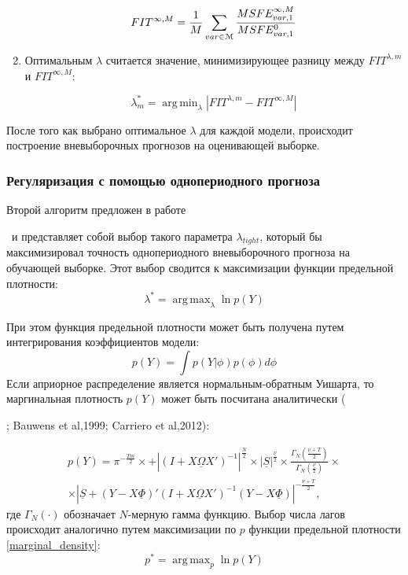 \documentclass[11pt]{article} %
\DeclareMathOperator*{\argmax}{arg\,max}
\DeclareMathOperator*{\argmin}{arg\,min}
\newcommand{\prior}{\underline}
\newcommand{\eng}[1]{\begin{otherlanguage}{english}#1\end{otherlanguage}}
\begin{document}
\begin{enumerate}
\begin{equation}
FIT^{\infty,M}=\frac{1}{M} \sum_{var\in \EuScript{M}} \frac{MSFE_{var,1}^{\infty,M}}{MSFE_{var,1}^{0}}
\end{equation}
\item Оптимальным $\lambda$ считается значение, минимизирующее разницу между $FIT^{\lambda,m}$ и $FIT^{\infty,M}$:

\begin{equation}
\lambda^*_m=\argmin_{\lambda} |FIT^{\lambda, m}-FIT^{\infty,M}|
\end{equation}
\end{enumerate}

После того как выбрано оптимальное $\lambda$ для каждой модели, происходит построение вневыборочных прогнозов на оценивающей выборке.

\subsubsection{Регуляризация с помощью однопериодного прогноза }

Второй алгоритм предложен в работе \eng{\cite{doan_al_1984}}~и представляет собой выбор такого параметра $\lambda_{tight}$, который бы максимизировал точность однопериодного вневыборочного прогноза на обучающей выборке. Этот выбор сводится к максимизации функции предельной плотности:
\begin{equation}
\lambda^*=\argmax_{\lambda} \ln p(Y)
\end{equation}

При этом функция предельной плотности может быть получена путем интегрирования коэффициентов модели:
\begin{equation}
p(Y)=\int p(Y|\phi)p(\phi) d \phi
\end{equation}
Если априорное распределение является нормальным-обратным Уишарта, то маргинальная плотность $p(Y)$ может быть посчитана аналитически (\eng{\cite{zellner_1996}}; Bauwens et al,1999; Carriero et al,2012):


\begin{multline}
p(Y)=\pi^{-\frac{Tm}{2}}\times +\left |(I+X\prior{\Omega} X')^{-1}\right|^{\frac{N}{2}}\times |\prior{S}|^{\frac{\prior{\nu}}{2}}\times \frac{\Gamma_N(\frac{\prior{\nu}+T}{2})}{\Gamma_N(\frac{\prior{\nu}}{2})}\times \\ \times
\left|\prior{S}+(Y-X\prior{\Phi})'(I+X\prior{\Omega} X')^{-1}(Y-X\prior{\Phi})\right|^{-\frac{\prior{\nu}+T}{2}},\label{marginal_density}
\end{multline}
где $\Gamma_N(\cdot)$ обозначает $N$-мерную гамма функцию.
Выбор числа лагов происходит аналогично путем максимизации по $p$ функции предельной плотности \eqref{marginal_density}:
\begin{equation}
p^*=\argmax_{p} \ln p(Y)
\end{equation}
\end{document}
